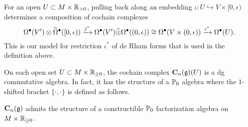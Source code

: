\documentclass[11pt]{amsart}
\numberwithin{equation}{section}
\begin{document}
\begin{rmk}
For an open $U \subset M \times \mathbb R_{>0}$, pulling back along an embedding $\iota : U \hookrightarrow V \times [0,\epsilon)$ determines a composition of cochain complexes
\[
\Omega^\bullet (V') \otimes \widetilde{\Omega}^\bullet([0,\epsilon)) \xrightarrow{j^*}  \Omega^\bullet (V') \widehat{\otimes} \Omega^\bullet((0,\epsilon)) \cong \Omega^\bullet(V \times (0,\epsilon)) \xrightarrow{\iota^*} \Omega^\bullet(U) .
\]
This is our model for restriction $\iota^*$ of de Rham forms that is used in the definition above.
\end{rmk}

On each open set $U \subset M \times \mathbb R_{\geq 0}$, the cochain complex $\mathbf C_n(\mathfrak g) (U)$ is a dg commutative algebra. 
In fact, it has the structure of a $\mathbb P_0$ algebra where the $1$-shifted bracket $\{\cdot, \cdot\}$ is defined as follows.

\begin{lmm}
$\mathbf C_n(\mathfrak g)$ admits the structure of a constructible $\mathbb P_0$ factorization algebra on~$M \times \mathbb R_{\geq 0}$. 
\end{lmm}
\end{document}
